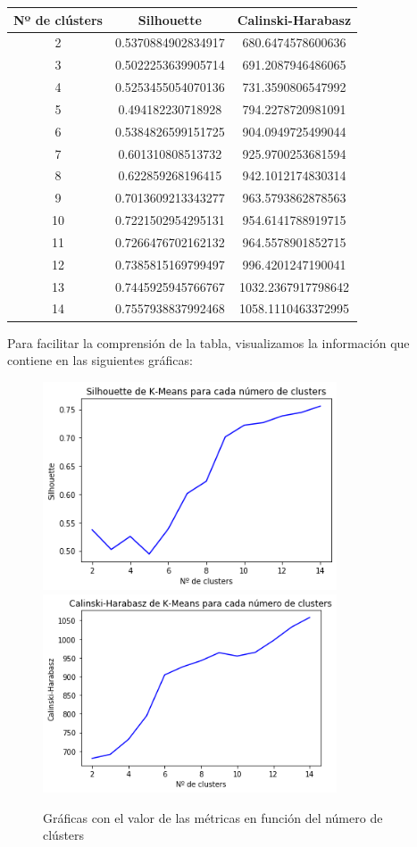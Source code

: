 \documentclass[a4]{article}
\begin{document}
\begin{center}
\begin{tabular}{|c|c|c|}
\hline
\multicolumn{1}{|c|}{\textbf{Nº de clústers}}& \textbf{Silhouette} & \textbf{Calinski-Harabasz}\\ \hline
  2  & 0.5370884902834917 & 680.6474578600636  \\ \hline
  3  & 0.5022253639905714 & 691.2087946486065  \\ \hline
  4  & 0.5253455054070136 & 731.3590806547992  \\ \hline
  5  & 0.494182230718928  & 794.2278720981091  \\ \hline
  6  & 0.5384826599151725 & 904.0949725499044  \\ \hline
  7  & 0.601310808513732  & 925.9700253681594  \\ \hline
  8  & 0.622859268196415  & 942.1012174830314  \\ \hline
  9  & 0.7013609213343277 & 963.5793862878563  \\ \hline
 10  & 0.7221502954295131 & 954.6141788919715  \\ \hline
 11  & 0.7266476702162132 & 964.5578901852715  \\ \hline
 12  & 0.7385815169799497 & 996.4201247190041  \\ \hline
 13  & 0.7445925945766767 & 1032.2367917798642 \\ \hline
 14  & 0.7557938837992468 & 1058.1110463372995 \\ \hline
\end{tabular}
\end{center}

Para facilitar la comprensión de la tabla, visualizamos la información que contiene en las siguientes gráficas:

\begin{figure}[H]
  \centering
  \caption{Gráficas con el valor de las métricas en función del número de clústers}
  \includegraphics[width=87mm]{imagenes/c2_kmeans_sil}
  \includegraphics[width=87mm]{imagenes/c2_kmeans_cal}
\end{figure}
\end{document}

